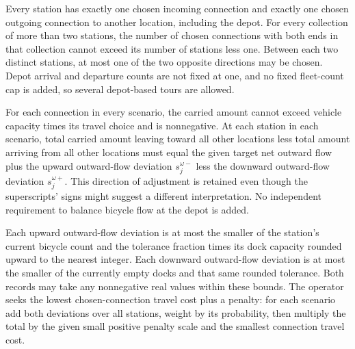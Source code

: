 \documentclass[10pt]{article}
\begin{document}
Every station has exactly one chosen incoming connection and exactly one chosen outgoing connection to another location, including the depot. For every collection of more than two stations, the number of chosen connections with both ends in that collection cannot exceed its number of stations less one. Between each two distinct stations, at most one of the two opposite directions may be chosen. Depot arrival and departure counts are not fixed at one, and no fixed fleet-count cap is added, so several depot-based tours are allowed.

For each connection in every scenario, the carried amount cannot exceed vehicle capacity times its travel choice and is nonnegative. At each station in each scenario, total carried amount leaving toward all other locations less total amount arriving from all other locations must equal the given target net outward flow plus the upward outward-flow deviation $s_j^{\omega-}$ less the downward outward-flow deviation $s_j^{\omega+}$. This direction of adjustment is retained even though the superscripts' signs might suggest a different interpretation. No independent requirement to balance bicycle flow at the depot is added.

Each upward outward-flow deviation is at most the smaller of the station's current bicycle count and the tolerance fraction times its dock capacity rounded upward to the nearest integer. Each downward outward-flow deviation is at most the smaller of the currently empty docks and that same rounded tolerance. Both records may take any nonnegative real values within these bounds. The operator seeks the lowest chosen-connection travel cost plus a penalty: for each scenario add both deviations over all stations, weight by its probability, then multiply the total by the given small positive penalty scale and the smallest connection travel cost.
\end{document}
